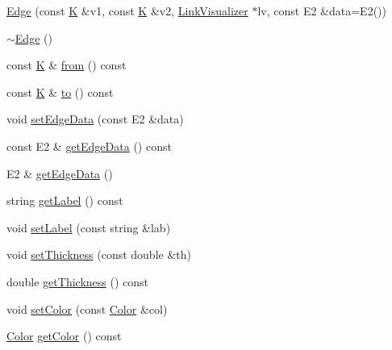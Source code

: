 \begin{DoxyCompactItemize}
\item 
\mbox{\hyperlink{classbridges_1_1_edge_ad7647870c01109744f5cd0b56c356d7e}{Edge}} (const \mbox{\hyperlink{namespacebridges_acfb0a4f7877d8f63de3e6862004c50edaa5f3c6a11b03839d46af9fb43c97c188}{K}} \&v1, const \mbox{\hyperlink{namespacebridges_acfb0a4f7877d8f63de3e6862004c50edaa5f3c6a11b03839d46af9fb43c97c188}{K}} \&v2, \mbox{\hyperlink{classbridges_1_1_link_visualizer}{Link\+Visualizer}} $\ast$lv, const E2 \&data=E2())
\item 
\mbox{\hyperlink{classbridges_1_1_edge_a06e7e74a95c1630d984929c8a7545425}{$\sim$\+Edge}} ()
\item 
const \mbox{\hyperlink{namespacebridges_acfb0a4f7877d8f63de3e6862004c50edaa5f3c6a11b03839d46af9fb43c97c188}{K}} \& \mbox{\hyperlink{classbridges_1_1_edge_abfa58a6a0dad99a49c347b795453b56f}{from}} () const
\item 
const \mbox{\hyperlink{namespacebridges_acfb0a4f7877d8f63de3e6862004c50edaa5f3c6a11b03839d46af9fb43c97c188}{K}} \& \mbox{\hyperlink{classbridges_1_1_edge_a13f76b5a36e89d637d1abddf41a81afa}{to}} () const
\item 
void \mbox{\hyperlink{classbridges_1_1_edge_a0f4b37731a5510b46709b095fa6eefb5}{set\+Edge\+Data}} (const E2 \&data)
\item 
const E2 \& \mbox{\hyperlink{classbridges_1_1_edge_a36e99b58bb9a3a04323ba9232673abca}{get\+Edge\+Data}} () const
\item 
E2 \& \mbox{\hyperlink{classbridges_1_1_edge_a59ce201560b26ec18a1947a38c82e36f}{get\+Edge\+Data}} ()
\item 
string \mbox{\hyperlink{classbridges_1_1_edge_a782f757603c38dd076c2c61b3ec8f37e}{get\+Label}} () const
\item 
void \mbox{\hyperlink{classbridges_1_1_edge_a2494d3e0e396663470310ce15a9e0b57}{set\+Label}} (const string \&lab)
\item 
void \mbox{\hyperlink{classbridges_1_1_edge_ab03559da0e0b95de8d659217ac4bda96}{set\+Thickness}} (const double \&th)
\item 
double \mbox{\hyperlink{classbridges_1_1_edge_a97166cb0de049612d233f2fecb55df06}{get\+Thickness}} () const
\item 
void \mbox{\hyperlink{classbridges_1_1_edge_aa723bc0f8accdf7edf42635bf61b7e9b}{set\+Color}} (const \mbox{\hyperlink{classbridges_1_1_color}{Color}} \&col)
\item 
\mbox{\hyperlink{classbridges_1_1_color}{Color}} \mbox{\hyperlink{classbridges_1_1_edge_a05ae24c3a4cd354532457257997e2c9c}{get\+Color}} () const
\end{DoxyCompactItemize}


